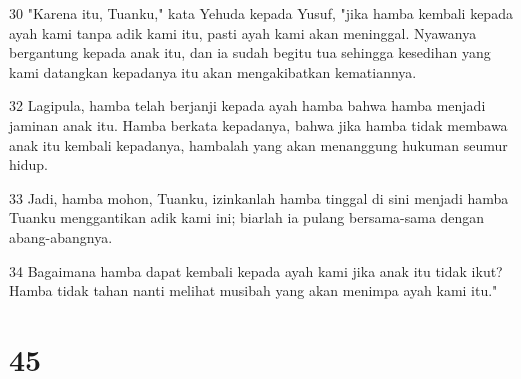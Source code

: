 \par 30 "Karena itu, Tuanku," kata Yehuda kepada Yusuf, "jika hamba kembali kepada ayah kami tanpa adik kami itu, pasti ayah kami akan meninggal. Nyawanya bergantung kepada anak itu, dan ia sudah begitu tua sehingga kesedihan yang kami datangkan kepadanya itu akan mengakibatkan kematiannya.
\par 32 Lagipula, hamba telah berjanji kepada ayah hamba bahwa hamba menjadi jaminan anak itu. Hamba berkata kepadanya, bahwa jika hamba tidak membawa anak itu kembali kepadanya, hambalah yang akan menanggung hukuman seumur hidup.
\par 33 Jadi, hamba mohon, Tuanku, izinkanlah hamba tinggal di sini menjadi hamba Tuanku menggantikan adik kami ini; biarlah ia pulang bersama-sama dengan abang-abangnya.
\par 34 Bagaimana hamba dapat kembali kepada ayah kami jika anak itu tidak ikut? Hamba tidak tahan nanti melihat musibah yang akan menimpa ayah kami itu."

\chapter{45}

